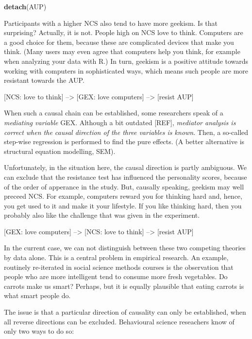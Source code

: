 \documentclass[]{svmono}
\newenvironment{Shaded}{\begin{snugshade}}{\end{snugshade}}
\newcommand{\KeywordTok}[1]{\textcolor[rgb]{0.13,0.29,0.53}{\textbf{#1}}}
\newcommand{\NormalTok}[1]{#1}
\theoremstyle{definition}
\theoremstyle{definition}
\theoremstyle{definition}
\theoremstyle{remark}
\begin{document}
\begin{Shaded}
\begin{Highlighting}[]
\KeywordTok{detach}\NormalTok{(AUP)}
\end{Highlighting}
\end{Shaded}

Participants with a higher NCS also tend to have more geekism. Is that
surprising? Actually, it is not. People high on NCS love to think.
Computers are a good choice for them, because these are complicated
devices that make you think. (Many users may even agree that computers
help you think, for example when analyzing your data with R.) In turn,
geekism is a positive attitude towards working with computers in
sophisticated ways, which means such people are more resistant towards
the AUP.

{[}NCS: love to think{]} --\textgreater{} {[}GEX: love computers{]}
--\textgreater{} {[}resist AUP{]}

When such a causal chain can be established, some researchers speak of a
\emph{mediating variable} GEX. Although a bit outdated {[}REF{]},
\emph{mediator analysis is correct when the causal direction of the
three variables is known}. Then, a so-called step-wise regression is
performed to find the pure effects. (A better alternative is structural
equation modelling, SEM).

Unfortunately, in the situation here, the causal direction is partly
ambiguous. We can exclude that the resistance test has influenced the
personality scores, because of the order of apperance in the study. But,
causally speaking, geekism may well preceed NCS. For example, computers
reward you for thinking hard and, hence, you get used to it and make it
your lifestyle. If you like thinking hard, then you probably also like
the challenge that was given in the experiment.

{[}GEX: love computers{]} --\textgreater{} {[}NCS: love to think{]}
--\textgreater{} {[}resist AUP{]}

In the current case, we can not distinguish between these two competing
theories by data alone. This is a central problem in empirical research.
An example, routinely re-iterated in social science methods courses is
the observation that people who are more intelligent tend to consume
more fresh vegetables. Do carrots make us smart? Perhaps, but it is
equally plausible that eating carrots is what smart people do.

The issue is that a particular direction of causality can only be
established, when all reverse directions can be excluded. Behavioural
science reseachers know of only two ways to do so:
\end{document}
